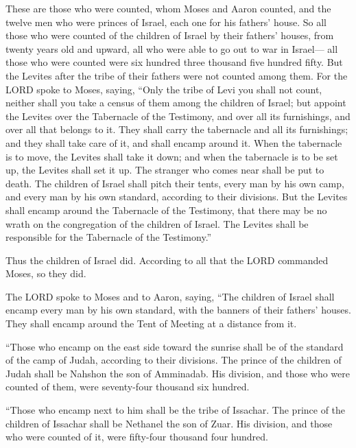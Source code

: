 \myverse{}These are those who were counted, whom Moses and Aaron counted,
and the twelve men who were princes of Israel, each one for his fathers’ house.
\myverse{}So all those who were counted of the children of Israel by their fathers’
houses, from twenty years old and upward, all who were able to go out to war in Israel—
\myverse{}all those who were counted were six hundred three thousand five hundred fifty.
\myverse{}But the Levites after the tribe of their fathers were not counted among them.
\myverse{}For the LORD spoke to Moses, saying,
\myverse{}“Only the tribe of Levi you shall not count, neither shall you take a census
of them among the children of Israel;
\myverse{}but appoint the Levites over the Tabernacle of the Testimony, and over all
its furnishings, and over all that belongs to it. They shall carry the tabernacle and all its furnishings;
and they shall take care of it, and shall encamp around it.
\myverse{}When the tabernacle is to move, the Levites shall take it down; and when the
tabernacle is to be set up, the Levites shall set it up. The stranger who comes near shall be put to death.
\myverse{}The children of Israel shall pitch their tents, every man by his own camp,
and every man by his own standard, according to their divisions.
\myverse{}But the Levites shall encamp around the Tabernacle of the Testimony, that
there may be no wrath on the congregation of the children of Israel. The Levites shall be responsible
for the Tabernacle of the Testimony.”


\myverse{}Thus the children of Israel did. According to all that the LORD
commanded Moses, so they did.


\mychapter{} \myverse*{}The LORD spoke to Moses and to Aaron, saying,
\myverse{}“The children of Israel shall encamp every man by his own standard, with the
banners of their fathers’ houses. They shall encamp around the Tent of Meeting at a distance from it.


\myverse{}“Those who encamp on the east side toward the sunrise shall be
of the standard of the camp of Judah, according to their divisions. The prince of the children of Judah
shall be Nahshon the son of Amminadab.
\myverse{}His division, and those who were counted of them, were seventy-four thousand
six hundred.


\myverse{}“Those who encamp next to him shall be the tribe of Issachar. The
prince of the children of Issachar shall be Nethanel the son of Zuar.
\myverse{}His division, and those who were counted of it, were fifty-four thousand four
hundred.


